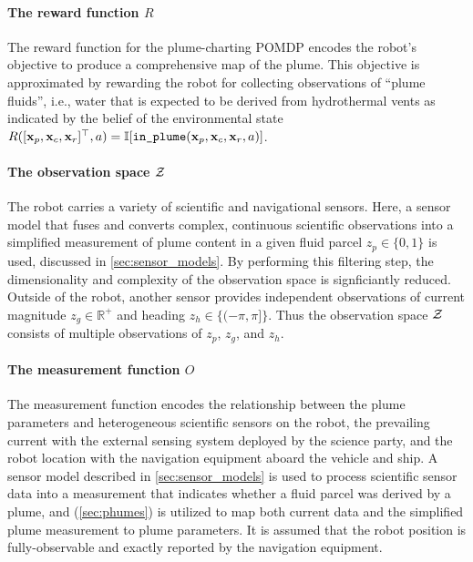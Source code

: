 \paragraph{The reward function $R$} The reward function for the plume-charting POMDP encodes the robot's objective to produce a comprehensive map of the plume. This objective is approximated by rewarding the robot for collecting observations of ``plume fluids'', i.e., water that is expected to be derived from hydrothermal vents as indicated by the belief of the environmental state $R([\x_p, \x_c, \x_r]^\top, a) = \indic{\texttt{in\_plume}(\x_p, \x_c, \x_r, a)}$. 

\paragraph{The observation space $\mathcal{Z}$} The robot carries a variety of scientific and navigational sensors. Here, a sensor model that fuses and converts complex, continuous scientific observations into a simplified measurement of plume content in a given fluid parcel $z_p \in \{0, 1\}$ is used, discussed in \cref{sec:sensor_models}. By performing this filtering step, the dimensionality and complexity of the observation space is signficiantly reduced. Outside of the robot, another sensor provides independent observations of current magnitude $z_g \in \mathbb{R}^+$ and heading $z_h \in \{(-\pi, \pi]\}$. Thus the observation space $\mathcal{Z}$ consists of multiple observations of $z_p$, $z_g$, and $z_h$.

\paragraph{The measurement function $O$} The measurement function encodes the relationship between the plume parameters and heterogeneous scientific sensors on the robot, the prevailing current with the external sensing system deployed by the science party, and the robot location with the navigation equipment aboard the vehicle and ship. A sensor model described in \cref{sec:sensor_models} is used to process scientific sensor data into a measurement that indicates whether a fluid parcel was derived by a plume, and \PHUMES (\cref{sec:phumes}) is utilized to map both current data and the simplified plume measurement to plume parameters. It is assumed that the robot position is fully-observable and exactly reported by the navigation equipment. 

